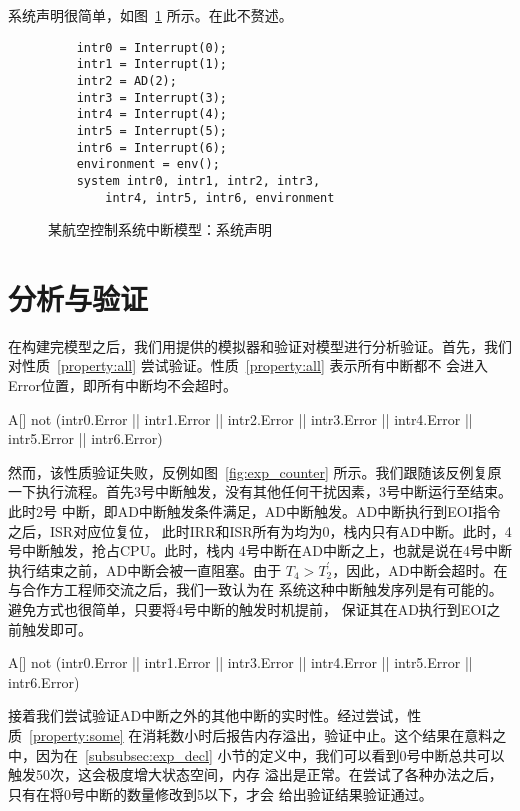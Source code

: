 系统声明很简单，如图~\ref{fig:exp_model_decl} 所示。在此不赘述。

\begin{figure}[H]
	\centering
	\begin{lstlisting}
	intr0 = Interrupt(0);
	intr1 = Interrupt(1);
	intr2 = AD(2);
	intr3 = Interrupt(3);
	intr4 = Interrupt(4);
	intr5 = Interrupt(5);
	intr6 = Interrupt(6);
	environment = env();
	system intr0, intr1, intr2, intr3, 
		intr4, intr5, intr6, environment
	\end{lstlisting}
	\caption{某航空控制系统中断模型：系统声明}
	\label{fig:exp_model_decl}
\end{figure}

\section{分析与验证}
\label{sec:experiment}

在构建完模型之后，我们用\uppaal 提供的模拟器和验证对模型进行分析验证。首先，我们
对性质~\ref{property:all} 尝试验证。性质~\ref{property:all} 表示所有中断都不
会进入Error位置，即所有中断均不会超时。

\begin{property}
	A[] not (intr0.Error || intr1.Error || intr2.Error || intr3.Error 
	|| intr4.Error || intr5.Error || intr6.Error) 
	\label{property:all}
\end{property}

然而，该性质验证失败，反例如图~\ref{fig:exp_counter} 所示。我们跟随该反例复原
一下执行流程。首先3号中断触发，没有其他任何干扰因素，3号中断运行至结束。此时2号
中断，即AD中断触发条件满足，AD中断触发。AD中断执行到EOI指令之后，ISR对应位复位，
此时IRR和ISR所有为均为0，栈内只有AD中断。此时，4号中断触发，抢占CPU。此时，栈内
4号中断在AD中断之上，也就是说在4号中断执行结束之前，AD中断会被一直阻塞。由于
$T_4>T^\prime_2$，因此，AD中断会超时。在与合作方工程师交流之后，我们一致认为在
系统这种中断触发序列是有可能的。避免方式也很简单，只要将4号中断的触发时机提前，
保证其在AD执行到EOI之前触发即可。

\begin{property}
	A[] not (intr0.Error || intr1.Error || intr3.Error || intr4.Error || 
	intr5.Error || intr6.Error) 
	\label{property:some}
\end{property}

接着我们尝试验证AD中断之外的其他中断的实时性。经过尝试，性质~\ref{property:some}
在消耗数小时后报告内存溢出，验证中止。这个结果在意料之中，因为在~\ref{subsubsec:exp_decl} 
小节的定义中，我们可以看到0号中断总共可以触发50次，这会极度增大状态空间，内存
溢出是正常。在尝试了各种办法之后，只有在将0号中断的数量修改到5以下，\uppaal 才会
给出验证结果\pozhehao 验证通过。

